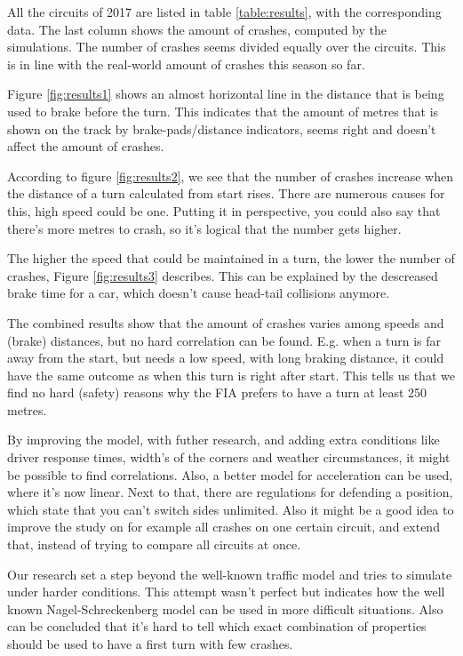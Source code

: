 All the circuits of 2017 are listed in table \ref{table:results}, with the corresponding data. The last column shows the amount of crashes, computed by the simulations. The number of crashes seems divided equally over the circuits. This is in line with the real-world amount of crashes this season so far.

Figure \ref{fig:results1} shows an almost horizontal line in the distance that is being used to brake before the turn. This indicates that the amount of metres that is shown on the track by brake-pads/distance indicators, seems right and doesn't affect the amount of crashes.

According to figure \ref{fig:results2}, we see that the number of crashes increase when the distance of a turn calculated from start rises. There are numerous causes for this, high speed could be one. Putting it in perspective, you could also say that there's more metres to crash, so it's logical that the number gets higher.

The higher the speed that could be maintained in a turn, the lower the number of crashes, Figure \ref{fig:results3} describes. This can be explained by the descreased brake time for a car, which doesn't cause head-tail collisions anymore.

The combined results show that the amount of crashes varies among speeds and (brake) distances, but no hard correlation can be found. E.g. when a turn is far away from the start, but needs a low speed, with long braking distance, it could have the same outcome as when this turn is right after start. This tells us that we find no hard (safety) reasons why the FIA prefers to have a turn at least 250 metres.

By improving the model, with futher research, and adding extra conditions like driver response times, width's of the corners and weather circumstances, it might be possible to find correlations. Also, a better model for acceleration can be used, where it's now linear. Next to that, there are regulations for defending a position, which state that you can't switch sides unlimited. Also it might be a good idea to improve the study on for example all crashes on one certain circuit, and extend that, instead of trying to compare all circuits at once.

Our research set a step beyond the well-known traffic model and tries to simulate under harder conditions. This attempt wasn't perfect but indicates how the well known Nagel-Schreckenberg model can be used in more difficult situations. Also can be concluded that it's hard to tell which exact combination of properties should be used to have a first turn with few crashes.
